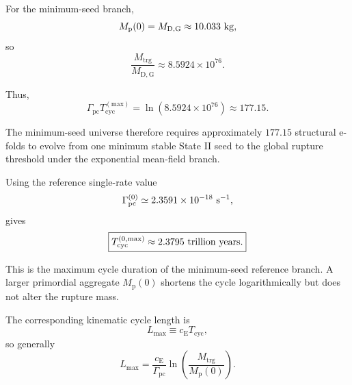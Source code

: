For the minimum-seed branch,
\begin{equation}
    M_{\mathrm p}(0)
    =
    M_{\mathrm{D,G}}
    \approx
    10.033
    \ {\rm kg},
\end{equation}
so
\begin{equation}
    \frac{
        M_{\mathrm{trg}}
    }{
        M_{\mathrm{D,G}}
    }
    \approx
    8.5924\times10^{76}.
\end{equation}

Thus,
\begin{equation}
    \boxed{
    \Gamma_{\mathrm{pc}}
    T_{\mathrm{cyc}}^{(\mathrm{max})}
    =
    \ln
    \left(
        8.5924\times10^{76}
    \right)
    \approx
    177.15.
    }
    \label{eq:AU_cycle_efolds}
\end{equation}

The minimum-seed universe therefore requires approximately
\(177.15\)
structural e-folds to evolve from one minimum stable State II seed to the
global rupture threshold under the exponential mean-field branch.

Using the reference single-rate value
\begin{equation}
    \Gamma_{\mathrm{pc}}^{(0)}
    \simeq
    2.3591\times10^{-18}
    \ {\rm s^{-1}},
\end{equation}
gives
\begin{equation}
    \boxed{
    T_{\mathrm{cyc}}^{(0,\mathrm{max})}
    \approx
    2.3795
    \ {\rm trillion\ years}.
    }
    \label{eq:AU_cycle_time_reference}
\end{equation}

This is the maximum cycle duration of the minimum-seed reference branch. A
larger primordial aggregate
\(M_{\mathrm p}(0)\)
shortens the cycle logarithmically but does not alter the rupture mass.

The corresponding kinematic cycle length is
\begin{equation}
    L_{\mathrm{max}}
    \equiv
    c_{\mathrm E}
    T_{\mathrm{cyc}},
\end{equation}
so generally
\begin{equation}
    \boxed{
    L_{\mathrm{max}}
    =
    \frac{
        c_{\mathrm E}
    }{
        \Gamma_{\mathrm{pc}}
    }
    \ln
    \left(
        \frac{
            M_{\mathrm{trg}}
        }{
            M_{\mathrm p}(0)
        }
    \right).
    }
    \label{eq:AU_cycle_length_general}
\end{equation}

